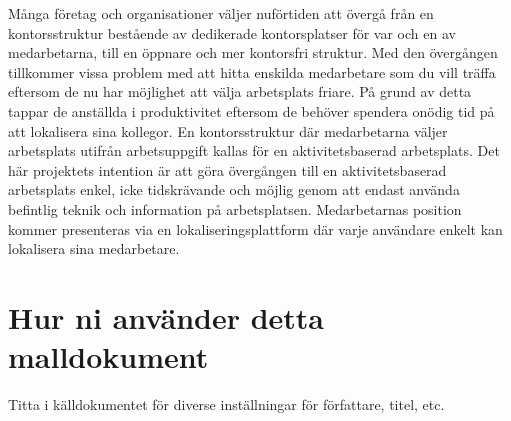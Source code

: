 \documentclass[swedish, a4paper,12pt]{article}
\begin{document}
\begin{sammanfattning}
%
%
Många företag och organisationer väljer nuförtiden att övergå från en kontorsstruktur bestående av dedikerade kontorsplatser för var och en av medarbetarna, till en öppnare och mer kontorsfri struktur. %
Med den övergången tillkommer vissa problem med att hitta enskilda medarbetare som du vill träffa eftersom de nu har möjlighet att välja arbetsplats friare. På grund av detta tappar de anställda i produktivitet eftersom de behöver spendera onödig tid på att lokalisera sina kollegor. En kontorsstruktur där medarbetarna väljer arbetsplats utifrån arbetsuppgift kallas för en aktivitetsbaserad arbetsplats. Det här projektets intention är att göra övergången till en aktivitetsbaserad arbetsplats enkel, icke tidskrävande och möjlig genom att endast använda befintlig teknik och information på arbetsplatsen. Medarbetarnas position kommer presenteras via en lokaliseringsplattform där varje användare enkelt kan lokalisera sina medarbetare.
\end{sammanfattning}

\tableofcontents


\cleardoublepage


\mainmatter


\iffalse
\section*{Hur ni använder detta malldokument}
Titta i källdokumentet för diverse inställningar för författare, titel, etc.
\end{document}
